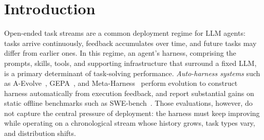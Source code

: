 





\section{Introduction}
\label{sec:intro}

{Open-ended task streams are a common deployment regime for LLM agents: tasks arrive continuously, feedback accumulates over time, and future tasks may differ from earlier ones. }
In this regime, an agent's harness, comprising the prompts, skills, tools, and supporting infrastructure that surround a fixed LLM, is a primary determinant of task-solving performance. \emph{Auto-harness systems} such as A-Evolve~\cite{lin2026position}, GEPA~\cite{agrawal2025gepa}, and Meta-Harness~\cite{lee2026meta} perform evolution to construct harness automatically from execution feedback, and report substantial gains on static offline benchmarks such as SWE-bench~\cite{jimenez2024swe}. Those evaluations, however, do not capture the central pressure of deployment: the harness must keep improving while operating on a chronological stream whose history grows, task types vary, and distribution shifts.







